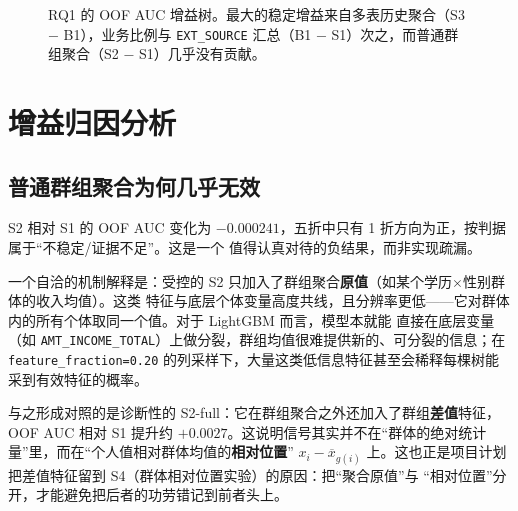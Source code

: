 \documentclass[11pt,UTF8,fontset=windows]{ctexrep}
\begin{document}
\begin{figure}[h]
\centering
{}
\caption{RQ1 的 OOF AUC 增益树。最大的稳定增益来自多表历史聚合（S3 $-$ B1），业务比例与
\texttt{EXT\_SOURCE} 汇总（B1 $-$ S1）次之，而普通群组聚合（S2 $-$ S1）几乎没有贡献。}
\label{fig:gain-tree}
\end{figure}

\section{增益归因分析}

\subsection{普通群组聚合为何几乎无效}

S2 相对 S1 的 OOF AUC 变化为 $-0.000241$，五折中只有 1 折方向为正，按判据属于“不稳定/证据不足”。这是一个
值得认真对待的负结果，而非实现疏漏。

一个自洽的机制解释是：受控的 S2 只加入了群组聚合\textbf{原值}（如某个学历$\times$性别群体的收入均值）。这类
特征与底层个体变量高度共线，且分辨率更低——它对群体内的所有个体取同一个值。对于 LightGBM 而言，模型本就能
直接在底层变量（如 \texttt{AMT\_INCOME\_TOTAL}）上做分裂，群组均值很难提供新的、可分裂的信息；在
\texttt{feature\_fraction=0.20} 的列采样下，大量这类低信息特征甚至会稀释每棵树能采到有效特征的概率。

与之形成对照的是诊断性的 S2-full：它在群组聚合之外还加入了群组\textbf{差值}特征，OOF AUC 相对 S1 提升约
$+0.0027$。这说明信号其实并不在“群体的绝对统计量”里，而在“个人值相对群体均值的\textbf{相对位置}”
$x_i-\overline{x}_{g(i)}$ 上。这也正是项目计划把差值特征留到 S4（群体相对位置实验）的原因：把“聚合原值”与
“相对位置”分开，才能避免把后者的功劳错记到前者头上。
\end{document}
